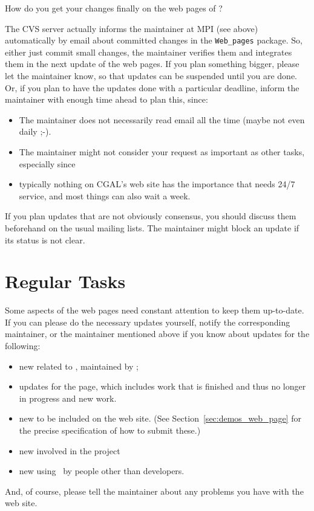 How do you get your changes finally on the web pages of \cgal?

The CVS server actually informs the maintainer at MPI (see above)
automatically by email about committed changes in the
\texttt{Web\_pages} package. So, either just commit small changes, the
maintainer verifies them and integrates them in the next update of the
web pages. If you plan something bigger, please let the maintainer
know, so that updates can be suspended until you are done.  Or, if you
plan to have the updates done with a particular deadline, inform the
maintainer with enough time ahead to plan this, since:

\begin{itemize}
    \item 
        The maintainer does not necessarily read email all the time
        (maybe not even daily ;-).
    \item
        The maintainer might not consider your request as important as
        other tasks, especially since 
    \item
        typically nothing on CGAL's web site has the importance that needs
        24/7 service, and most things can also wait a week.
\end{itemize}

If you plan updates that are not obviously consensus, you should discuss them
beforehand on the usual mailing lists. The maintainer might block an
update if its status is not clear.


\section{Regular Tasks}

Some aspects of the web pages need constant attention to keep them
up-to-date. If you can please do the necessary updates yourself,
notify the corresponding maintainer, or the maintainer mentioned above
if you know about updates for the following:

\begin{itemize}
   \item new 
         related to \cgal, maintained by 
         ;
   \item updates for the 
         page, which includes work that is finished and thus no longer in 
         progress and new work.
   \item new 
         to be included on the web site. (See Section~\ref{sec:demos_web_page}
         for the precise specification of how to submit these.)
   \item new 
         involved in the project
   \item new 
         using \cgal\ by people other than developers.
\end{itemize}

And, of course, please tell the maintainer about any problems you have
with the web site.

